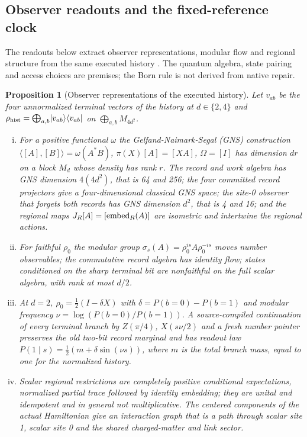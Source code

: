 \documentclass[11pt]{article}
\newtheorem{proposition}[theorem]{Proposition}
\theoremstyle{definition}
\theoremstyle{remark}
\theoremstyle{plain}
\newcommand{\proj}[1]{\lvert #1\rangle\langle #1\rvert}
\begin{document}
\subsection{Observer readouts and the fixed-reference clock}
\label{sec:readouts}

The readouts below extract observer representations, modular flow and
regional structure from the same executed history \cite{csOBS}. The quantum
algebra, state pairing and access choices are premises; the Born rule is not
derived from native repair.

\begin{proposition}[Observer representations of the executed history]
\label{prop:gns}
Let $v_{ab}$ be the four unnormalized terminal vectors of the history at
$d\in\{2,4\}$ and $\rho_{\rm hist}=\bigoplus_{a,b}\proj{v_{ab}}$ on
$\bigoplus_{a,b}M_{4d^2}$.
\begin{enumerate}[(i)]
\item For a positive functional $\omega$ the
Gelfand-Naimark-Segal (GNS) construction $\langle[A],[B]\rangle=\omega(A^*B)$,
$\pi(X)[A]=[XA]$, $\Omega=[I]$ has dimension $dr$ on a block $M_d$ whose
density has rank $r$. The record and work algebra has GNS dimension
$4(4d^2)$, that is 64 and 256; the four committed record projectors give a
four-dimensional classical GNS space; the site-0 observer that forgets both
records has GNS dimension $d^2$, that is 4 and 16; and the regional maps
$J_R[A]=[{\rm embed}_R(A)]$ are isometric and intertwine the regional
actions.
\item For faithful $\rho_0$ the modular group
$\sigma_s(A)=\rho_0^{is}A\rho_0^{-is}$ moves number observables; the
commutative record algebra has identity flow; states conditioned on the sharp
terminal bit are nonfaithful on the full scalar algebra, with rank at most
$d/2$.
\item At $d=2$, $\rho_0=\frac12(I-\delta X)$ with $\delta=P(b=0)-P(b=1)$ and
modular frequency $\nu=\log(P(b=0)/P(b=1))$. A source-compiled
continuation of every terminal branch by $Z(\pi/4)$, $X(s\nu/2)$ and a
fresh number pointer preserves the old two-bit record marginal and has
readout law $P(1\mid s)=\frac12(m+\delta\sin(\nu s))$, where $m$ is the
total branch mass, equal to one for the normalized history.
\item Scalar regional restrictions are completely positive conditional
expectations, normalized partial trace followed by identity embedding; they
are unital and idempotent and in general not multiplicative. The centered
components of the actual Hamiltonian give an interaction graph that is a
path through scalar site 1, scalar site 0 and the shared charged-matter and
link sector.
\end{enumerate}
\end{proposition}
\end{document}
